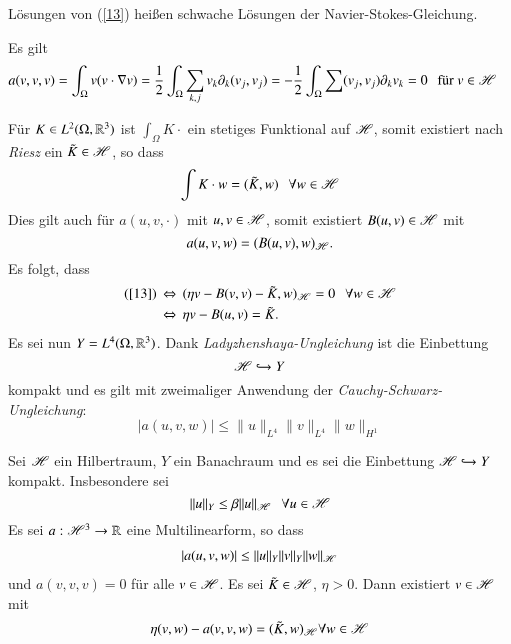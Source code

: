Lösungen von (\ref{13}) heißen schwache Lösungen der Navier-Stokes-Gleichung.

\begin{remark}
    Es gilt
    \begin{align*}
        a(v,v,v)&=\int_\Omega v(v\cdot \nabla v)=\frac12 \int_\Omega\sum_{k,j} v_k\partial_k(v_j,v_j)
        =-\frac12 \int_\Omega\sum(v_j,v_j)\partial_kv_k=0 \hspace{.25cm} \text{für } v\in \mathscr H 
    \end{align*}
\end{remark}
Für $K\in L^2 (\Omega,\mathbb{R}^3)$ ist $\int_\Omega K \cdot$ ein stetiges Funktional auf $\mathscr H$, somit
existiert nach \textit{Riesz} ein $\tilde K \in \mathscr H$, so dass
\[
    \int K\cdot w= (\tilde K, w)  \hspace{.25cm} \forall w\in \mathscr H
\]
Dies gilt auch für $a(u,v,\cdot)$ mit $u,v\in \mathscr H$, somit existiert $B(u,v) \in \mathscr H$ mit
\[
    a(u,v,w)=(B(u,v),w)_{\mathscr H}.
\]
Es folgt, dass
\begin{align*}
    (\ref{13}) \, &\Leftrightarrow \, (\eta v - B(v,v)- \tilde K, w)_{\mathscr H}=0 \hspace{.25cm} \forall w\in \mathscr H\\
        &\Leftrightarrow \, \eta v - B(u,v)=\tilde K.
\end{align*}
Es sei nun $Y=L^4(\Omega,\mathbb{R}^3)$. Dank \textit{Ladyzhenshaya-Ungleichung} ist die Einbettung
\[
    \mathscr H \hookrightarrow Y
\]
kompakt und es gilt mit zweimaliger Anwendung der \textit{Cauchy-Schwarz-Ungleichung}:
\[
    |a(u,v,w)|\leq\|u\|_{L^4}\|v\|_{L^4}\|w\|_{H^1}
\]


\begin{theorem}\label{005}
Sei $\mathscr H$ ein Hilbertraum, $Y$ ein Banachraum und es sei die Einbettung $\mathscr H \hookrightarrow Y $
kompakt. Insbesondere sei
\[
    \|u\|_Y\leq \beta \|u\|_{\mathscr H} \hspace{.25cm} \forall u \in \mathscr H
\]
Es sei $a: \mathscr H^3 \rightarrow \mathbb{R}$ eine Multilinearform, so dass
\begin{align}\label{14}
    |a(u,v,w)|\leq \|u\|_Y\|v\|_Y\|w\|_{\mathscr H}
\end{align}
und $a(v,v,v)=0$ für alle $v\in \mathscr H$. Es sei $\tilde K\in \mathscr H$, $\eta >0$. Dann existiert
$v\in \mathscr H$ mit
\[
    \eta(v,w)- a(v,v,w)= (\tilde K, w)_{\mathscr H} \forall w \in \mathscr H
\]
\end{theorem}

